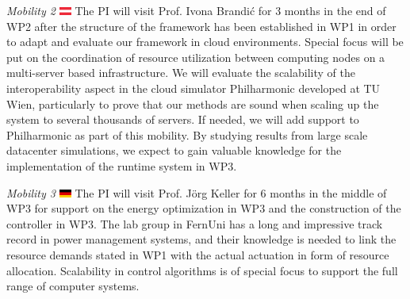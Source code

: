 \documentclass{article}
\begin{document}
\textit{Mobility 2 }\includegraphics[width=0.4cm]{fig/aus.png} The PI will visit Prof. Ivona Brandi\'{c} for 3 months in the end of WP2 after the structure of the framework has been established in WP1 in order to adapt and evaluate our framework in cloud environments. 
Special focus will be put on the coordination of resource utilization between computing nodes on a multi-server based infrastructure.
We will evaluate the scalability of the interoperability aspect in the cloud simulator Philharmonic developed at TU Wien, particularly to prove that our methods are sound when scaling up the system to several thousands of servers. 
If needed, we will add support to Philharmonic as part of this mobility.
By studying results from large scale datacenter simulations, we expect to gain valuable knowledge for the implementation of the runtime system in WP3. \smallskip

\textit{Mobility 3 }\includegraphics[width=0.4cm]{fig/ger.png} The PI will visit Prof. J\"{o}rg Keller for 6 months in the middle of WP3 for support on the energy optimization in WP3 and the construction of the controller in WP3.
The lab group in FernUni has a long and impressive track record in power management systems, 
and their knowledge is needed to link the resource demands stated in WP1 with the actual actuation in form of resource allocation.
Scalability in control algorithms is of special focus to support the full range of computer systems.


{\footnotesize
}

\end{document}
